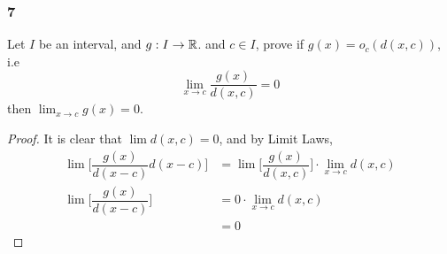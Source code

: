 \documentclass[../main.tex]{subfiles}
\begin{document}
\subsubsection*{7}
\begin{wts}
    Let $I$ be an interval, and $g: I\to \mathbb{R}$. and $c\in I$, prove if $g(x) = o_c(d(x,c))$, i.e\[\lim_{x\to c}\dfrac{g(x)}{d(x,c)}=0\]
    then $\lim_{x\to c}g(x)=0$.
\end{wts}
\begin{proof}
    It is clear that $\lim d(x,c)=0$, and by Limit Laws,
    \begin{align*}\lim\biggl[\dfrac{g(x)}{d(x-c)}d(x-c)\biggr]&=\lim\biggl[\dfrac{g(x)}{d(x,c)}\biggr]\cdot\lim_{x\to c}d(x,c)\\[2ex]
    \lim\biggl[\dfrac{g(x)}{d(x-c)}\biggr]&=0\cdot \lim_{x\to c}d(x,c)\\[2ex]
    &=0
    \end{align*}
\end{proof}
\end{document}
